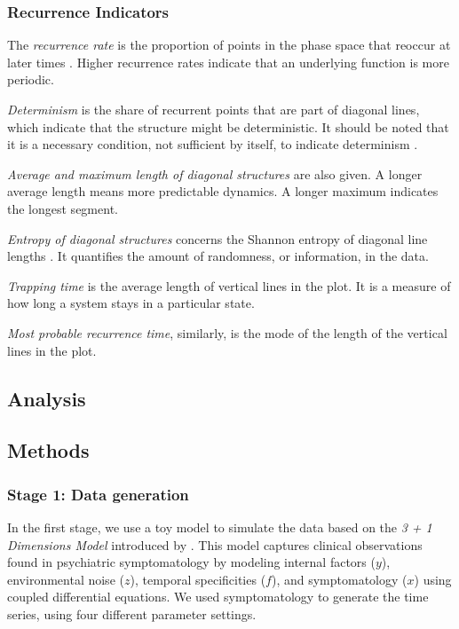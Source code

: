 \documentclass[utf8]{FrontiersinVancouver}
\begin{document}
\subsubsection{Recurrence Indicators}

The \textit{recurrence rate} is the proportion of points in the phase space that reoccur at later times \citep{webber2005recurrence}. Higher recurrence rates indicate that an underlying function is more periodic. 

\textit{Determinism} is the share of recurrent points that are part of diagonal lines, which indicate that the structure might be deterministic. It should be noted that it is a necessary condition, not sufficient by itself, to indicate determinism \citep{marwanHowAvoidPotential2011}.

\textit{Average and maximum length of diagonal structures} are also given. A longer average length means more predictable dynamics. A longer maximum indicates the longest segment.

\textit{Entropy of diagonal structures} concerns the Shannon entropy of diagonal line lengths \citep{kraemerRecurrenceThresholdSelection2018}. It quantifies the amount of randomness, or information, in the data.

\textit{Trapping time} is the average length of vertical lines in the plot. It is a measure of how long a system stays in a particular state.

\textit{Most probable recurrence time}, similarly, is the mode of the length of the vertical lines in the plot. 

\subsection{Analysis}

\subsection{Methods}

\subsubsection{Stage 1: Data generation}

In the first stage, we use a toy model to simulate the data based on the \textit{3 + 1 Dimensions Model} introduced by \citep{gauldDynamicalSystemsComputational2023}. This model captures clinical observations found in psychiatric symptomatology by modeling internal factors ($y$), environmental noise ($z$), temporal specificities ($f$), and symptomatology ($x$) using coupled differential equations. We used symptomatology to generate the time series, using four different parameter settings.
\end{document}
